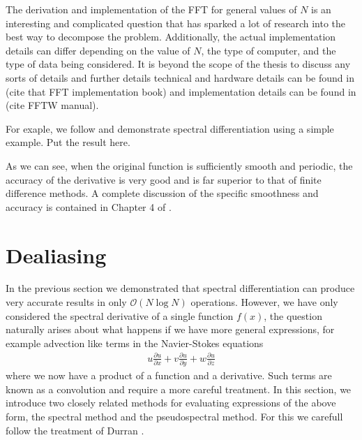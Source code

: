 The derivation and implementation of the FFT for general values of $N$ is an interesting and complicated question that has sparked a lot of research into the best way to decompose the problem. Additionally, the actual implementation details can differ depending on the value of $N$, the type of computer, and the type of data being considered. It is beyond the scope of the thesis to discuss any sorts of details and further details technical and hardware details can be found in (cite that FFT implementation book) and implementation details can be found in (cite FFTW manual).

For exaple, we follow \cite{trefethen_spectral} and demonstrate spectral differentiation using a simple example. Put the result here. 

As we can see, when the original function is sufficiently smooth and periodic, the accuracy of the derivative is very good and is far superior to that of finite difference methods. A complete discussion of the specific smoothness and accuracy is contained in Chapter 4 of \cite{trefethen_spectral}.
\section{Dealiasing} 
In the previous section we demonstrated that spectral differentiation can produce very accurate results in only $\mathcal{O}(N\log N)$ operations. However, we have only considered the spectral derivative of a single function $f(x)$, the question naturally arises about what happens if we have more general expressions, for example advection like terms in the Navier-Stokes equations 
\begin{align}
u\frac{\partial u}{\partial x} + v\frac{\partial u}{\partial y} +w\frac{\partial u}{\partial z}
\end{align}
where we now have a product of a function and a derivative. Such terms are known as a convolution and require a more careful treatment. In this section, we introduce two closely related methods for evaluating expressions of the above form, the spectral method and the pseudospectral method. For this we carefull follow the treatment of Durran \cite{durran}. 

